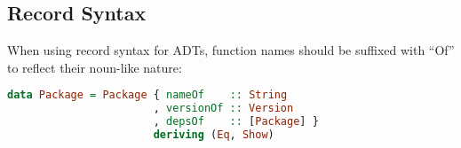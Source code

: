 \documentclass{article}
\begin{document}
\subsection{Record Syntax}\label{record-syntax}

When using record syntax for ADTs, function names should be suffixed
with ``Of'' to reflect their noun-like nature:

\begin{shaded}
\begin{lstlisting}[language=haskell]
data Package = Package { nameOf    :: String
                       , versionOf :: Version
                       , depsOf    :: [Package] }
                       deriving (Eq, Show)
\end{lstlisting}
\end{shaded}
\end{document}
